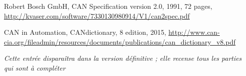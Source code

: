 


\small{
\begin{thebibliography}{99}
\thispagestyle{empty}



Robert Bosch GmbH, CAN Specification version 2.0, 1991, 72 pages, \url{http://kvaser.com/software/7330130980914/V1/can2spec.pdf} 

CAN in Automation, CANdictionary, 8 edition, 2015, \url{http://www.can-cia.org/fileadmin/resources/documents/publications/can_dictionary_v8.pdf}


\emph{Cette entrée disparaîtra dans la version définitive ; elle recense tous les parties qui sont à compléter}







\end{thebibliography}
}